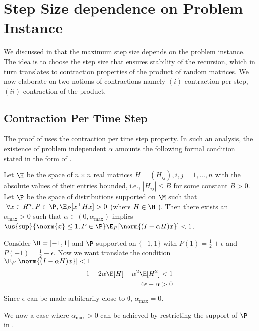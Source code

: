 \section{Step Size dependence on Problem Instance}\label{sec:stepprob}
We discussed in  that the maximum step size depends on the problem instance. The idea is to choose the step size that ensures stability of the recursion, which in turn translates to contraction properties of the product of random matrices. We now elaborate on two notions of contractions namely $(i)$ contraction per step, $(ii)$ contraction of the product.
\subsection{Contraction Per Time Step}
The proof of  uses the contraction per time step property. In such an analysis, the existence of problem independent $\alpha$ amounts the following formal condition stated in the form of .
\begin{lemma}\label{steptheorem}
Let $\H$ be the space of $n\times n$ real matrices $H=(H_{ij}),i,j=1,\ldots,n$ with the absolute values of their entries bounded, i.e., $|H_{ij}|\leq B$ for some constant $B>0$. Let $\P$ be the space of distributions supported on $\M$ such that $~\forall x\in R^n, P\in \P,\E_{P}[x^\top H x] >0$ (where $H\in\H$ ). Then there exists an $\alpha_{\max}>0$ such that $\alpha\in(0,\alpha_{\max})$ implies $\us{\sup}{\norm{x}\leq 1,P\in\P}\E_{P}[\norm{(I-\alpha H)x}]< 1$.
\end{lemma}
\begin{example}
Consider $\H=[-1,1]$ and $\P$ supported on $\{-1,1\}$ with $P(1)=\frac{1}{2}+\epsilon$ and $P(-1)=\frac{1}{2}-\epsilon$. Now we want translate the condition $\E_{P}[\norm{(I-\alpha H)x}]<1$
\begin{align}
\begin{split}
1-2\alpha\E[H]+\alpha^2 \E[H^2]<1\\
4\epsilon-\alpha>0\\
\end{split}
\end{align}
Since $\epsilon$ can be made arbitrarily close to $0$, $\alpha_{\max}=0$.
\end{example}
We now a case where $\alpha_{\max}>0$  can be achieved by restricting the support of $\P$ in .
